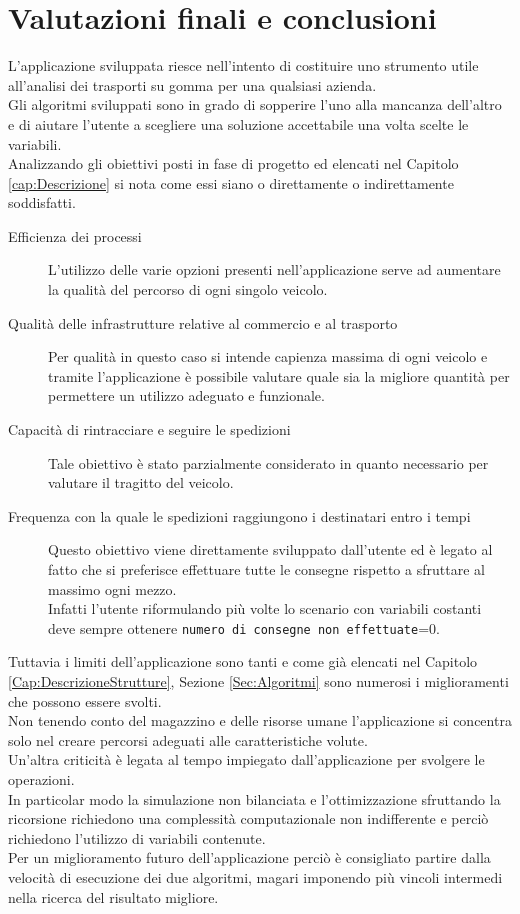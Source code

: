 \documentclass[a4paper,12pt]{report}
\begin{document}
\chapter{Valutazioni finali e conclusioni}
L'applicazione sviluppata riesce nell'intento di costituire uno strumento utile all'analisi dei
trasporti su gomma per una qualsiasi azienda.\\
Gli algoritmi sviluppati sono in grado di sopperire l'uno alla mancanza dell'altro e di aiutare
l'utente a scegliere una soluzione accettabile una volta scelte le variabili.\\
Analizzando gli obiettivi posti in fase di progetto ed elencati nel Capitolo \ref{cap:Descrizione} si nota come essi
siano o direttamente o indirettamente soddisfatti.
\begin{description}
\item[Efficienza dei processi] L'utilizzo delle varie opzioni presenti nell'applicazione serve ad
aumentare la qualità del percorso di ogni singolo veicolo.
\item[Qualità delle infrastrutture relative al commercio e al trasporto] Per qualità in questo caso
si intende capienza massima di ogni veicolo e tramite l'applicazione è possibile valutare quale
sia la migliore quantità per permettere un utilizzo adeguato e funzionale.
\item[Capacità di rintracciare e seguire le spedizioni] Tale obiettivo è stato parzialmente considerato
in quanto necessario per valutare il tragitto del veicolo.
\item[Frequenza con la quale le spedizioni raggiungono i destinatari entro i tempi]  Questo obiettivo viene direttamente sviluppato dall'utente ed è legato al fatto che
si preferisce effettuare tutte le consegne rispetto a sfruttare al massimo ogni mezzo. \\
Infatti l'utente riformulando più volte lo scenario con variabili costanti deve sempre ottenere
\texttt{numero di consegne non effettuate}=0.
\end{description}
Tuttavia i limiti dell'applicazione sono tanti e come già elencati nel Capitolo \ref{Cap:DescrizioneStrutture}, Sezione \ref{Sec:Algoritmi} sono numerosi
i miglioramenti che possono essere svolti.\\
Non tenendo conto del magazzino e delle risorse umane l'applicazione si concentra solo nel creare
percorsi adeguati alle caratteristiche volute.\\
Un'altra criticità è legata al tempo impiegato dall'applicazione per svolgere le operazioni.\\
In particolar modo la simulazione non bilanciata e l'ottimizzazione sfruttando la ricorsione richiedono
una complessità computazionale non indifferente e perciò richiedono l'utilizzo di variabili contenute.\\
Per un miglioramento futuro dell'applicazione perciò è consigliato partire dalla velocità di esecuzione
dei due algoritmi, magari imponendo più vincoli intermedi nella ricerca del risultato migliore.
\end{document}
